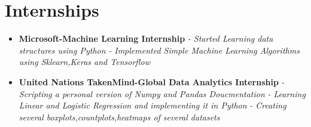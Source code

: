 \documentclass[a4paper,12pt]{article}
\begin{document}
\section*{Internships}
\begin{itemize}
    \item{\textbf{\large{Microsoft-Machine Learning Internship}}
    \newline
    \textit{- Started Learning data structures using Python}
    \newline
    \textit{- Implemented Simple Machine Learning Algorithms using Sklearn,Keras and Tensorflow}}
\end{itemize}
\begin{itemize}
    \item{\textbf{\large{United Nations TakenMind-Global Data Analytics Internship}}
    \newline
    \textit{- Scripting a personal version of Numpy and Pandas Doucmentation }
    \newline
    \textit{- Learning Linear and Logistic Regression and implementing it in Python}
    \newline
    \textit{- Creating several boxplots,countplots,heatmaps of several datasets}}
\end{itemize}



\end{document}
